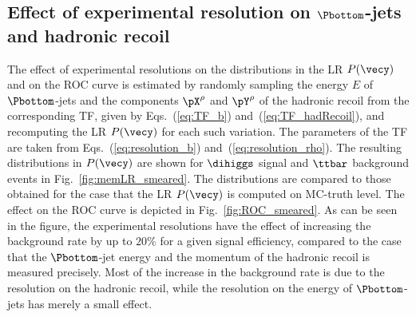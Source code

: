 \subsection{Effect of experimental resolution on $\Pbottom$-jets and hadronic recoil}

The effect of experimental resolutions on the distributions in the LR $P(\vecy)$ and on the ROC curve is estimated
by randomly sampling the energy $E$ of $\Pbottom$-jets and the components $\pX^{\rho}$ and $\pY^{\rho}$ of the hadronic recoil from the corresponding TF,
given by Eqs.~(\ref{eq:TF_b}) and~(\ref{eq:TF_hadRecoil}), and recomputing the LR $P(\vecy)$ for each such variation.
The parameters of the TF are taken from Eqs.~(\ref{eq:resolution_b}) and~(\ref{eq:resolution_rho}).
The resulting distributions in $P(\vecy)$ are shown for $\dihiggs$ signal and $\ttbar$ background events in Fig.~\ref{fig:memLR_smeared}.
The distributions are compared to those obtained for the case that the LR $P(\vecy)$ is computed on MC-truth level.
The effect on the ROC curve is depicted in Fig.~\ref{fig:ROC_smeared}.
As can be seen in the figure, the experimental resolutions have the effect of increasing the background rate by up to $20\%$ for a given signal efficiency,
compared to the case that the $\Pbottom$-jet energy and the momentum of the hadronic recoil is measured precisely.
Most of the increase in the background rate is due to the resolution on the hadronic recoil,
while the resolution on the energy of $\Pbottom$-jets has merely a small effect.

